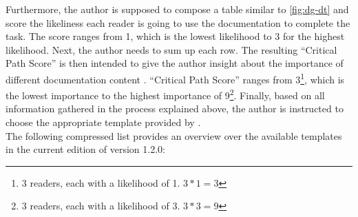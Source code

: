 \noindent
Furthermore, the author is supposed to compose a table similar to \cref{fig:dg-dt} and score the likeliness each reader is 
going to use the documentation to complete the task.
The score ranges from 1, which is the lowest likelihood to 3 for the highest likelihood.
Next, the author needs to sum up each row.
The resulting ``Critical Path Score'' is then intended to give the author insight about the importance of different documentation 
content \cite{shorterGoodDocsProject2024}.
``Critical Path Score'' ranges from 3\footnote{3 readers, each with a likelihood of 1. $3*1=3$}, 
which is the lowest importance to the highest importance of 9\footnote{3 readers, each with a likelihood of 3. $3*3=9$}.
Finally, based on all information gathered in the process explained above, the author is instructed to choose the appropriate template provided by \good\space \cite{shorterGoodDocsProject2024}.\\
The following compressed list provides an overview over the available templates in the current edition of \good\space version 1.2.0:

